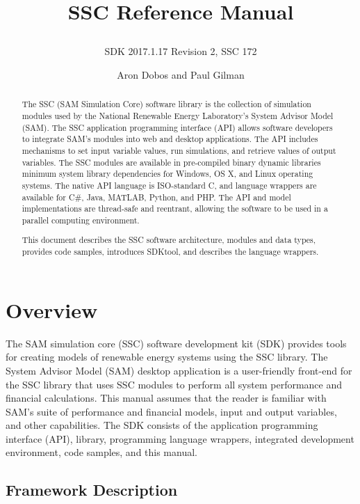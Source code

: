 \documentclass{scrartcl} %
\title{SSC Reference Manual
\subtitle{SDK 2017.1.17 Revision 2, SSC 172}}
\author{Aron Dobos and Paul Gilman}
\newcommand{\+}{\discretionary{\mbox{\scriptsize$\hookleftarrow$}}{}{}}
\begin{document}
\maketitle
\vspace{2.5in}
\begin{abstract}
The SSC (SAM Simulation Core) software library is the collection of simulation modules used by the National Renewable Energy Laboratory's  System Advisor Model (SAM).  The SSC application programming interface (API) allows software developers to integrate SAM's modules into web and desktop applications. The API includes mechanisms to set input variable values, run simulations, and retrieve values of output variables. The SSC modules are available in pre-compiled binary dynamic libraries minimum system library dependencies for Windows, OS X, and Linux operating systems. The native API language is ISO-standard C, and language wrappers are available for C\#, Java, MATLAB, Python, and PHP. The API and model implementations are thread-safe and reentrant, allowing the software to be used in a parallel computing environment.

This document describes the SSC software architecture, modules and data types, provides code samples, introduces SDKtool, and describes the language wrappers.
\end{abstract} 

\newpage
\tableofcontents
\newpage

\section{Overview}
\label{sec_overview}

The SAM simulation core (SSC) software development kit (SDK) provides tools for creating models of renewable energy systems using the SSC library. The System Advisor Model (SAM) desktop application is a user-friendly front-end for the SSC library that uses SSC modules to perform all system performance and financial calculations. This manual assumes that the reader is familiar with SAM's suite of performance and financial models, input and output variables, and other capabilities. The SDK consists of the application programming interface (API), library, programming language wrappers, integrated development environment, code samples, and this manual.

\subsection{Framework Description}
\end{document}

